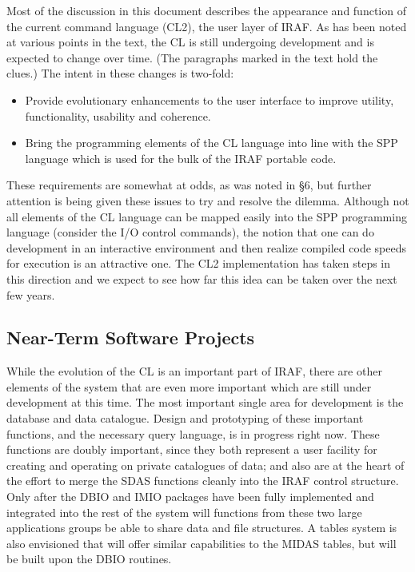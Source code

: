 Most of the discussion in this document describes the appearance 
and function of the current command language (CL2), the user layer 
of IRAF.  As has been noted at various points in the text, 
the CL is still undergoing
development and is expected to change over time.  (The paragraphs
marked  in the text hold the clues.)  The intent
in these changes is two-fold:

\begin{itemize}

\item Provide evolutionary enhancements to the user interface
to improve utility, functionality, usability and coherence.

\item Bring the programming elements of the CL language
into line with the SPP language which is used for the bulk of the
IRAF portable code.

\end{itemize}

\noindent
These requirements are somewhat at odds, as was noted in \S 6, but
further attention is being given these issues to try and resolve 
the dilemma.  Although not all elements of the CL language can
be mapped easily into the SPP programming language (consider the I/O
control commands), the notion that one
can do development in an interactive environment and then
realize compiled code speeds for execution is an attractive one.
The CL2 implementation has
taken steps in this direction and we expect to see how far this idea
can be taken over the next few years.

\subsection{Near-Term Software Projects}

While the evolution of the CL is an important part of IRAF, there
are other elements of the system that are even more important which are
still under development at this time.  The most important single area
for development is the database and data catalogue.
Design and prototyping of these important functions, and the
necessary query language, is in progress
right now.  These functions are doubly important, since they both represent 
a user facility for creating and operating on private catalogues 
of data; and also are at the heart of the effort to merge the
SDAS functions cleanly into the IRAF control structure.  Only after
the DBIO and IMIO packages have been fully implemented and integrated
into the rest of the system will functions from these two large
applications groups be able to share data and file structures.  
A tables system is also envisioned that will offer similar capabilities
to the MIDAS tables, but will be built upon the DBIO routines.  

